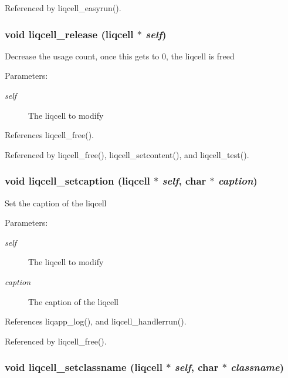 Referenced by liqcell\_\-easyrun().
\subsubsection[{liqcell\_\-release}]{\setlength{\rightskip}{0pt plus 5cm}void liqcell\_\-release (liqcell $\ast$ {\em self})}\label{d5/da2/liqcell_8c_211b41b1487a3daf16432b93459f58d6}


Decrease the usage count, once this gets to 0, the liqcell is freed \begin{Desc}
\item[Parameters:]
\begin{description}
\item[{\em self}]The liqcell to modify \end{description}
\end{Desc}


References liqcell\_\-free().

Referenced by liqcell\_\-free(), liqcell\_\-setcontent(), and liqcell\_\-test().
\subsubsection[{liqcell\_\-setcaption}]{\setlength{\rightskip}{0pt plus 5cm}void liqcell\_\-setcaption (liqcell $\ast$ {\em self}, \/  char $\ast$ {\em caption})}\label{d5/da2/liqcell_8c_df7b143fdd148d3119bf0b5aa5f7cb16}


Set the caption of the liqcell \begin{Desc}
\item[Parameters:]
\begin{description}
\item[{\em self}]The liqcell to modify \item[{\em caption}]The caption of the liqcell \end{description}
\end{Desc}


References liqapp\_\-log(), and liqcell\_\-handlerrun().

Referenced by liqcell\_\-free().
\subsubsection[{liqcell\_\-setclassname}]{\setlength{\rightskip}{0pt plus 5cm}void liqcell\_\-setclassname (liqcell $\ast$ {\em self}, \/  char $\ast$ {\em classname})}\label{d5/da2/liqcell_8c_6559854ce1171311fc2b4c4bee73ba90}


